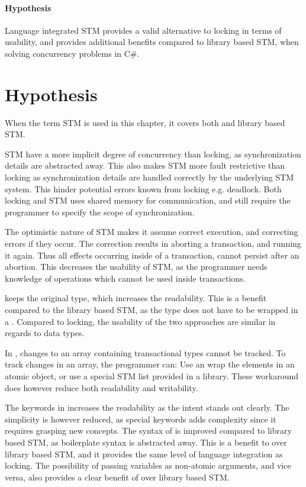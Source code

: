 \paragraph{Hypothesis} Language integrated \ac{STM} provides a valid alternative to locking in terms of usability, and provides additional benefits compared to library based \ac{STM}, when solving concurrency problems in C\#. 

\section{Hypothesis}
When the term \ac{STM} is used in this chapter, it covers both \stmname and library based \ac{STM}. 

\ac{STM} have a more implicit degree of concurrency than locking, as synchronization details are abstracted away. This also makes \ac{STM} more fault restrictive than locking as synchronization details are handled correctly by the underlying \ac{STM} system. This hinder potential errors known from locking e.g. deadlock. Both locking and \ac{STM} uses shared memory for communication, and still require the programmer to specify the scope of synchronization.

The optimistic nature of \ac{STM} makes it assume correct execution, and correcting errors if they occur. The correction results in aborting a transaction, and running it again. Thus all effects occurring inside of a transaction, cannot persist after an abortion. This decreases the usability of \ac{STM}, as the programmer needs knowledge of operations which cannot be used inside transactions.

\stmname keeps the original type, which increases the readability. This is a benefit compared to the library based \ac{STM}, as the type does not have to be wrapped in a . Compared to locking, the usability of the two approaches are similar in regards to data types. 

In \stmname, changes to an array containing transactional types cannot be tracked. To track changes in an array, the programmer can: Use an  wrap the elements in an atomic object, or use a special \ac{STM} list provided in a library. These workaround does however reduce both readability and writability. 

The keywords in \stmname increases the readability as the intent stands out clearly. The simplicity is however reduced, as special keywords adds complexity since it requires grasping new concepts. The syntax of \stmname is improved compared to library based \ac{STM}, as boilerplate syntax is abstracted away. This is a benefit to \stmname over library based \ac{STM}, and it provides the same level of language integration as locking. The possibility of passing  variables as non-atomic arguments, and vice versa, also provides a clear benefit of \stmname over library based \ac{STM}. 

